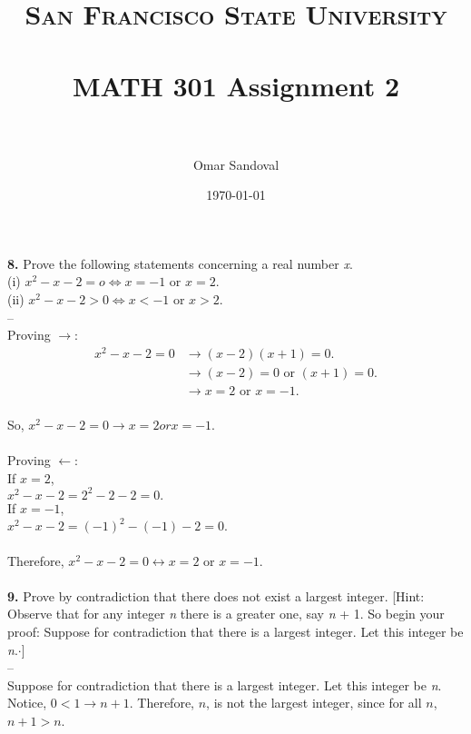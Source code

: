 \documentclass[paper=letter, fontsize=11pt]{scrartcl} %
\title{	
\normalfont \normalsize 
\textsc{San Francisco State University} \\ [25pt]
\horrule{0.5pt} \\[0.4cm] %
\huge MATH 301 Assignment 2  \\ %
\horrule{2pt} \\[0.5cm] %
}
\author{Omar Sandoval}
\date{\normalsize\today}
\begin{document}
\maketitle

\textbf{8.} Prove the following statements concerning a real number \textit{x}. \\
(i) $x^2 - x - 2 = o \Leftrightarrow x = -1$ or $x = 2$.\\
(ii) $x^2 - x - 2 > 0 \Leftrightarrow x < -1$ or $x > 2$.
\\
-- \\
Proving $\rightarrow$: \\
\begin{align*}
	x^2 - x - 2 = 0 &\rightarrow (x-2)(x+1) = 0. \\
	&\rightarrow (x-2) = 0 \text{ or } (x+1) = 0. \\
	&\rightarrow x = 2 \text{ or } x = -1. \\
\end{align*}

So, $x^2 - x - 2 = 0 \rightarrow x = 2 or x = -1.$ \\\\
Proving $\leftarrow$: \\

If $x = 2$, \\
	
	$x^2 - x - 2 = 2^2 - 2 - 2 = 0.$ \\
	
If $x = -1$, \\
	
	$x^2 - x - 2 = (-1)^2 - (-1) - 2 = 0.$ \\\\
Therefore, $x^2 - x - 2 = 0 \leftrightarrow x = 2$ or $x = -1$.\\
\\

\textbf{9.}	Prove by contradiction that there does not exist a largest integer. [Hint: Observe that for any integer \textit{n} there is a greater one, say \textit{n} + 1. So begin your proof:  
Suppose for contradiction that there is a largest integer. Let this integer be \textit{n}.$ \cdot$]
\\
-- \\ 
Suppose for contradiction that there is a largest integer. Let this integer be \textit{n}. Notice, $0 < 1 \rightarrow n + 1$. Therefore, $n$, is not the largest integer, since for all $n$, $n + 1 > n$.\\
\\
\end{document}
